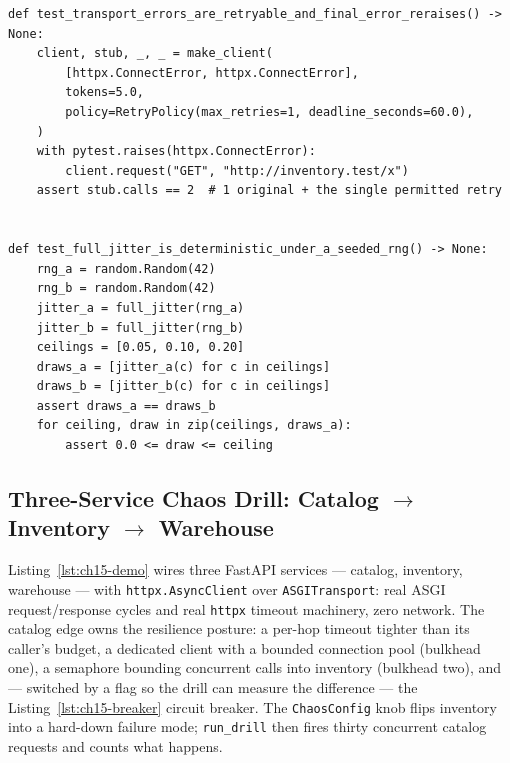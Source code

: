\begin{verbatim}
def test_transport_errors_are_retryable_and_final_error_reraises() -> None:
    client, stub, _, _ = make_client(
        [httpx.ConnectError, httpx.ConnectError],
        tokens=5.0,
        policy=RetryPolicy(max_retries=1, deadline_seconds=60.0),
    )
    with pytest.raises(httpx.ConnectError):
        client.request("GET", "http://inventory.test/x")
    assert stub.calls == 2  # 1 original + the single permitted retry


def test_full_jitter_is_deterministic_under_a_seeded_rng() -> None:
    rng_a = random.Random(42)
    rng_b = random.Random(42)
    jitter_a = full_jitter(rng_a)
    jitter_b = full_jitter(rng_b)
    ceilings = [0.05, 0.10, 0.20]
    draws_a = [jitter_a(c) for c in ceilings]
    draws_b = [jitter_b(c) for c in ceilings]
    assert draws_a == draws_b
    for ceiling, draw in zip(ceilings, draws_a):
        assert 0.0 <= draw <= ceiling
\end{verbatim}

\subsection{Three-Service Chaos Drill: Catalog $\to$ Inventory $\to$ Warehouse}
\label{subsec:ch15-code-demo}

Listing~\ref{lst:ch15-demo} wires three FastAPI services --- catalog,
inventory, warehouse --- with \texttt{httpx.AsyncClient} over
\texttt{ASGITransport}: real ASGI request/response cycles and real
\texttt{httpx} timeout machinery, zero network. The catalog edge owns the
resilience posture: a per-hop timeout tighter than its caller's budget, a
dedicated client with a bounded connection pool (bulkhead one), a semaphore
bounding concurrent calls into inventory (bulkhead two), and --- switched
by a flag so the drill can measure the difference --- the
Listing~\ref{lst:ch15-breaker} circuit breaker. The \texttt{ChaosConfig}
knob flips inventory into a hard-down failure mode; \texttt{run\_drill}
then fires thirty concurrent catalog requests and counts what happens.

